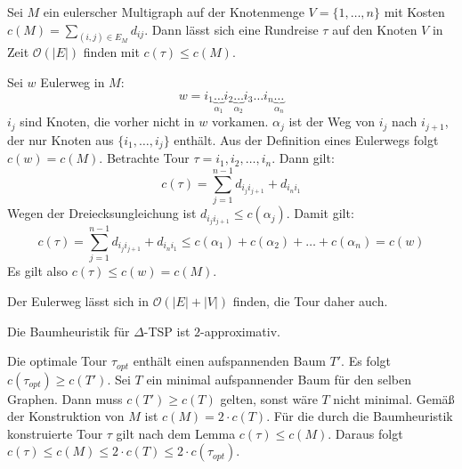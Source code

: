 \begin{Lma}
  \hspace{\parindent}Sei $M$ ein eulerscher Multigraph auf der Knotenmenge $V= \{ 1, \ldots, n\}$ mit Kosten $c(M) = \sum_{(i,j) \in E_M} d_{ij}$. Dann lässt sich eine Rundreise $\tau$ auf den Knoten $V$ in Zeit $\mathcal{O}(|E|)$ finden mit $c(\tau) \le c(M)$.
\end{Lma}

\begin{Bew}
  \hspace{\parindent}Sei $w$ Eulerweg in $M$:
  \[ w = i_1 \underbrace{\ldots}_{\alpha_1} i_2 \underbrace{\ldots}_{\alpha_2} i_3 \ldots i_n \underbrace{\ldots}_{\alpha_n} \]
  $i_j$ sind Knoten, die vorher nicht in $w$ vorkamen. $\alpha_j$ ist der Weg von $i_j$ nach $i_{j+1}$, der nur Knoten aus $\{i_1, \ldots, i_j\}$ enthält. Aus der Definition eines Eulerwegs folgt $c(w) = c(M)$. Betrachte Tour $\tau = i_1, i_2, \ldots, i_n$. Dann gilt:
    \[ c(\tau) = \sum_{j=1}^{n-1} d_{i_j i_{j+1}} + d_{i_n i_1}\]
  Wegen der Dreiecksungleichung ist $d_{i_j i_{j+1}} \le c(\alpha_j)$. Damit gilt:
    \[ c(\tau) = \sum_{j=1}^{n-1} d_{i_j i_{j+1}} + d_{i_n i_1} \le c(\alpha_1) + c(\alpha_2) + \ldots + c(\alpha_n) = c(w)\]
  Es gilt also $c(\tau) \le c(w) = c(M)$.
\end{Bew}

Der Eulerweg lässt sich in $\mathcal{O}(|E| + |V|)$ finden, die Tour daher auch.

\begin{Satz}
  \hspace{\parindent}Die Baumheuristik für $\varDelta$-TSP ist $2$-approximativ.
\end{Satz}

\begin{Bew}
  \hspace{\parindent}Die optimale Tour $\tau_{opt}$ enthält einen aufspannenden Baum $T'$. Es folgt $c(\tau_{opt}) \ge c(T')$. Sei $T$ ein minimal aufspannender Baum für den selben Graphen. Dann muss $c(T') \ge c(T)$ gelten, sonst wäre $T$ nicht minimal. Gemäß der Konstruktion von $M$ ist $c(M) = 2 \cdot c(T)$. Für die durch die Baumheuristik konstruierte Tour $\tau$ gilt nach dem Lemma $c(\tau) \le c(M)$. Daraus folgt $c(\tau) \le c(M) \le 2 \cdot c(T) \le 2 \cdot c(\tau_{opt})$.
\end{Bew}


